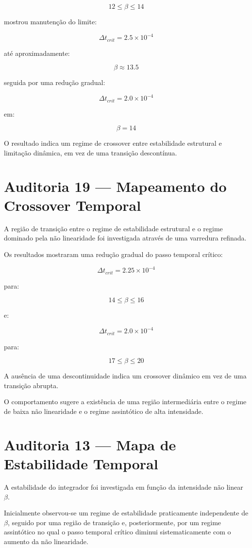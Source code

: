 \documentclass[11pt,a4paper]{article}
\begin{document}
\[
12\leq\beta\leq14
\]

mostrou manutenção do limite:

\[
\Delta t_{crit}=2.5\times10^{-4}
\]

até aproximadamente:

\[
\beta\approx13.5
\]

seguida por uma redução gradual:

\[
\Delta t_{crit}=2.0\times10^{-4}
\]

em:

\[
\beta=14
\]

O resultado indica um regime de crossover entre estabilidade
estrutural e limitação dinâmica, em vez de uma transição
descontínua.
\section{Auditoria 19 — Mapeamento do Crossover Temporal}

A região de transição entre o regime de estabilidade estrutural
e o regime dominado pela não linearidade foi investigada através
de uma varredura refinada.

Os resultados mostraram uma redução gradual do passo temporal
crítico:

\[
\Delta t_{crit}=2.25\times10^{-4}
\]

para:

\[
14\leq\beta\leq16
\]

e:

\[
\Delta t_{crit}=2.0\times10^{-4}
\]

para:

\[
17\leq\beta\leq20
\]

A ausência de uma descontinuidade indica um crossover dinâmico
em vez de uma transição abrupta.

O comportamento sugere a existência de uma região intermediária
entre o regime de baixa não linearidade e o regime assintótico de
alta intensidade.
\section{Auditoria 13 — Mapa de Estabilidade Temporal}

A estabilidade do integrador foi investigada em função da intensidade
não linear $\beta$.

Inicialmente observou-se um regime de estabilidade praticamente
independente de $\beta$, seguido por uma região de transição e,
posteriormente, por um regime assintótico no qual o passo temporal
crítico diminui sistematicamente com o aumento da não linearidade.
\end{document}
